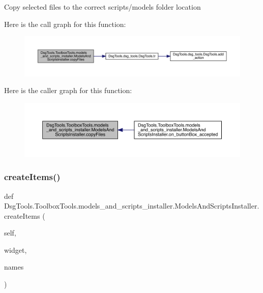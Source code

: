\begin{DoxyVerb}Copy selected files to the correct scripts/models folder location
\end{DoxyVerb}
 Here is the call graph for this function\+:
\nopagebreak
\begin{figure}[H]
\begin{center}
\leavevmode
\includegraphics[width=350pt]{class_dsg_tools_1_1_toolbox_tools_1_1models__and__scripts__installer_1_1_models_and_scripts_installer_ae7e84dd0125fcda0198d5cf207c49fcb_cgraph}
\end{center}
\end{figure}
Here is the caller graph for this function\+:
\nopagebreak
\begin{figure}[H]
\begin{center}
\leavevmode
\includegraphics[width=350pt]{class_dsg_tools_1_1_toolbox_tools_1_1models__and__scripts__installer_1_1_models_and_scripts_installer_ae7e84dd0125fcda0198d5cf207c49fcb_icgraph}
\end{center}
\end{figure}
\mbox{\label{class_dsg_tools_1_1_toolbox_tools_1_1models__and__scripts__installer_1_1_models_and_scripts_installer_ad2266ab47eccbe9ae8eb4141fdbecf1a}} 
\subsubsection{\texorpdfstring{create\+Items()}{createItems()}}
{\footnotesize\ttfamily def Dsg\+Tools.\+Toolbox\+Tools.\+models\+\_\+and\+\_\+scripts\+\_\+installer.\+Models\+And\+Scripts\+Installer.\+create\+Items (\begin{DoxyParamCaption}\item[{}]{self,  }\item[{}]{widget,  }\item[{}]{names }\end{DoxyParamCaption})}

